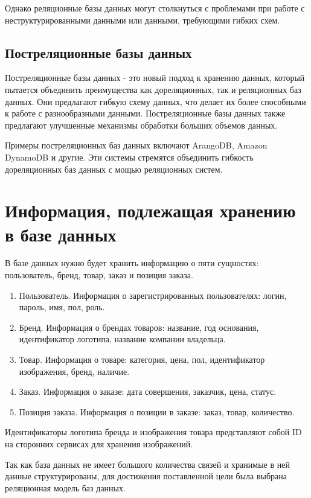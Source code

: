 \documentclass{bmstu}
\begin{document}
Однако реляционные базы данных могут столкнуться с проблемами при работе с неструктурированными данными или данными, требующими гибких схем.

\subsection{Постреляционные базы данных}

Постреляционные базы данных - это новый подход к хранению данных, который пытается объединить преимущества как дореляционных, так и реляционных баз данных. Они предлагают гибкую схему данных, что делает их более способными к работе с разнообразными данными. Постреляционные базы данных также предлагают улучшенные механизмы обработки больших объемов данных.

Примеры постреляционных баз данных включают ArangoDB, Amazon DynamoDB и другие. Эти системы стремятся объединить гибкость дореляционных баз данных с мощью реляционных систем.

\section{Информация, подлежащая хранению в базе данных}

В базе данных нужно будет хранить информацию о пяти сущностях: пользователь, бренд, товар, заказ и позиция заказа.
\begin{enumerate}
\item Пользователь. 
Информация о зарегистрированных пользователях: логин, пароль, имя, пол, роль.
\item Бренд. 
Информация о брендах товаров: название, год основания, идентификатор логотипа, название компании владельца.
\item Товар. 
Информация о товаре: категория, цена, пол, идентификатор изображения, бренд, наличие.
\item Заказ.
Информация о заказе: дата совершения, заказчик, цена, статус.
\item Позиция заказа.
Информация о позиции в заказе: заказ, товар, количество.
\end{enumerate}

Идентификаторы логотипа бренда и изображения товара представляют собой ID на сторонних сервисах для хранения изображений.

Так как база данных не имеет большого количества связей и хранимые в ней данные структурированы, для достижения поставленной цели была выбрана реляционная модель баз данных.
\end{document}
